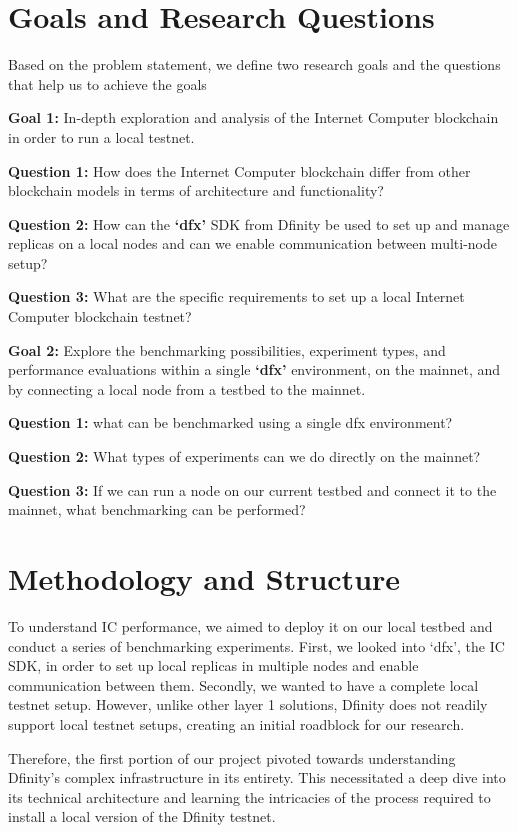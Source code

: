 \section{Goals and Research Questions}

Based on the problem statement, we define two research goals and the questions that help us to achieve the goals

\textbf{Goal 1:}  In-depth exploration and analysis of the Internet Computer blockchain in order to run a local testnet.

\textbf{Question 1:} How does the Internet Computer blockchain differ from other blockchain models in terms of architecture and 
functionality?

\textbf{Question 2:} How can the \textbf{`dfx'} SDK from Dfinity be used to set up and manage replicas on a local nodes and can we 
enable communication between multi-node setup?

\textbf{Question 3:} What are the specific requirements to set up a local Internet Computer blockchain testnet?

\textbf{Goal 2:} Explore the benchmarking possibilities, experiment types, and performance evaluations within a single \textbf{`dfx'} 
environment, on the mainnet, and by connecting a local node from a testbed to the mainnet.

\textbf{Question 1:} what can be benchmarked using a single dfx environment?

\textbf{Question 2:} What types of experiments can we do directly on the mainnet?

\textbf{Question 3:} If we can run a node on our current testbed and connect it to the mainnet, what benchmarking can be performed?

\section{Methodology and Structure}

To understand IC performance, we aimed to deploy it on our local testbed and conduct a series of benchmarking experiments. First, we 
looked into `dfx', the IC SDK, in order to set up local replicas in multiple nodes and enable communication between them. Secondly, 
we wanted to have a complete local testnet setup. However, unlike other layer 1 solutions, Dfinity does not readily support local 
testnet setups, creating an initial roadblock for our research.

Therefore, the first portion of our project pivoted towards understanding Dfinity's complex infrastructure in its entirety. This 
necessitated a deep dive into its technical architecture and learning the intricacies of the process required to install a local 
version of the Dfinity testnet.

